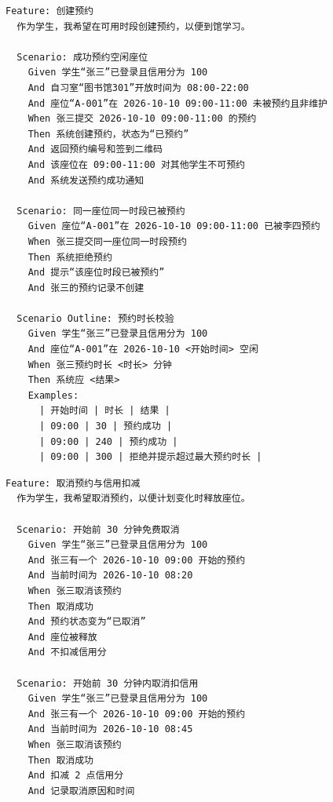 \documentclass[11pt,a4paper]{article}
\begin{document}
\begin{framed}
\begin{verbatim}
Feature: 创建预约
  作为学生，我希望在可用时段创建预约，以便到馆学习。

  Scenario: 成功预约空闲座位
    Given 学生“张三”已登录且信用分为 100
    And 自习室“图书馆301”开放时间为 08:00-22:00
    And 座位“A-001”在 2026-10-10 09:00-11:00 未被预约且非维护
    When 张三提交 2026-10-10 09:00-11:00 的预约
    Then 系统创建预约，状态为“已预约”
    And 返回预约编号和签到二维码
    And 该座位在 09:00-11:00 对其他学生不可预约
    And 系统发送预约成功通知

  Scenario: 同一座位同一时段已被预约
    Given 座位“A-001”在 2026-10-10 09:00-11:00 已被李四预约
    When 张三提交同一座位同一时段预约
    Then 系统拒绝预约
    And 提示“该座位时段已被预约”
    And 张三的预约记录不创建

  Scenario Outline: 预约时长校验
    Given 学生“张三”已登录且信用分为 100
    And 座位“A-001”在 2026-10-10 <开始时间> 空闲
    When 张三预约时长 <时长> 分钟
    Then 系统应 <结果>
    Examples:
      | 开始时间 | 时长 | 结果 |
      | 09:00 | 30 | 预约成功 |
      | 09:00 | 240 | 预约成功 |
      | 09:00 | 300 | 拒绝并提示超过最大预约时长 |
\end{verbatim}
\end{framed}

\begin{framed}
\begin{verbatim}
Feature: 取消预约与信用扣减
  作为学生，我希望取消预约，以便计划变化时释放座位。

  Scenario: 开始前 30 分钟免费取消
    Given 学生“张三”已登录且信用分为 100
    And 张三有一个 2026-10-10 09:00 开始的预约
    And 当前时间为 2026-10-10 08:20
    When 张三取消该预约
    Then 取消成功
    And 预约状态变为“已取消”
    And 座位被释放
    And 不扣减信用分

  Scenario: 开始前 30 分钟内取消扣信用
    Given 学生“张三”已登录且信用分为 100
    And 张三有一个 2026-10-10 09:00 开始的预约
    And 当前时间为 2026-10-10 08:45
    When 张三取消该预约
    Then 取消成功
    And 扣减 2 点信用分
    And 记录取消原因和时间
\end{verbatim}
\end{framed}
\end{document}

